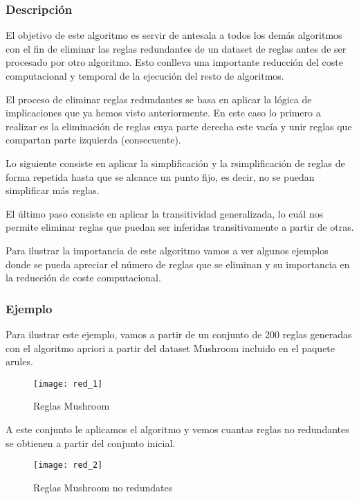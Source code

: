 \subsubsection{Descripci\'on} 

El objetivo de este algoritmo es servir de antesala a todos los dem\'as algoritmos con el fin de eliminar las reglas redundantes de un dataset de reglas antes de ser procesado por otro algoritmo. Esto conlleva una importante reducci\'on del coste computacional y temporal de la ejecuci\'on del resto de algoritmos.

El proceso de eliminar reglas redundantes se basa en aplicar la l\'ogica de implicaciones que ya hemos visto anteriormente. En este caso lo primero a realizar es la eliminaci\'on de reglas cuya parte derecha este vac\'ia y unir reglas que compartan parte izquierda (consecuente).

Lo siguiente consiste en aplicar la simplificaci\'on y la rsimplificaci\'on de reglas de forma repetida hasta que se alcance un punto fijo, es decir, no se puedan simplificar m\'as reglas.

El \'ultimo paso consiste en aplicar la transitividad generalizada, lo cu\'al nos permite eliminar reglas que puedan ser inferidas transitivamente a partir de otras.

Para ilustrar la importancia de este algoritmo vamos a ver algunos ejemplos donde se pueda apreciar el n\'umero de reglas que se eliminan y su importancia en la reducci\'on de coste computacional.

\subsubsection{Ejemplo}

Para ilustrar este ejemplo, vamos a partir de un conjunto de 200 reglas generadas con el algoritmo apriori a partir del dataset Mushroom incluido en el paquete arules.

\begin{figure}[H]
    \centering
    \texttt{[image: red\_1]}
    \caption{Reglas Mushroom}
    \label{fig:red_1}
\end{figure} 

A este conjunto le aplicamos el algoritmo y vemos cuantas reglas no redundantes se obtienen a partir del conjunto inicial.

\begin{figure}[H]
    \centering
    \texttt{[image: red\_2]}
    \caption{Reglas Mushroom no redundates}
    \label{fig:red_2}
\end{figure} 

